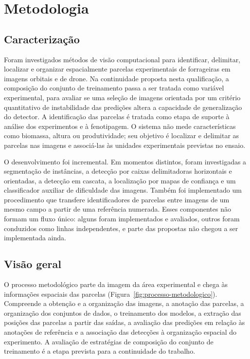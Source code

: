 \chapter{Metodologia}
\label{cap:metodologia}

\section{Caracteriza\c{c}\~ao}
\label{sec:caracterizacao}

Foram investigados m\'etodos de vis\~ao computacional para identificar, delimitar, localizar e organizar espacialmente parcelas experimentais de forrageiras em imagens orbitais e de drone. Na continuidade proposta nesta qualifica\c{c}\~ao, a composi\c{c}\~ao do conjunto de treinamento passa a ser tratada como vari\'avel experimental, para avaliar se uma sele\c{c}\~ao de imagens orientada por um crit\'erio quantitativo de instabilidade das predi\c{c}\~oes altera a capacidade de generaliza\c{c}\~ao do detector. A identifica\c{c}\~ao das parcelas \'e tratada como etapa de suporte \`a an\'alise dos experimentos e \`a fenotipagem. O sistema n\~ao mede caracter\'isticas como biomassa, altura ou produtividade; seu objetivo \'e localizar e delimitar as parcelas nas imagens e associ\'a-las \`as unidades experimentais previstas no ensaio.

O desenvolvimento foi incremental. Em momentos distintos, foram investigadas a segmenta\c{c}\~ao de inst\^ancias, a detec\c{c}\~ao por caixas delimitadoras horizontais e orientadas, a detec\c{c}\~ao em cascata, a localiza\c{c}\~ao por mapas de confian\c{c}a e um classificador auxiliar de dificuldade das imagens. Tamb\'em foi implementado um procedimento que transfere identificadores de parcelas entre imagens de um mesmo campo a partir de uma refer\^encia numerada. Esses componentes n\~ao formam um fluxo \'unico: alguns foram implementados e avaliados, outros foram conduzidos como linhas independentes, e parte das propostas n\~ao chegou a ser implementada ainda.

\section{Vis\~ao geral}
\label{sec:visao-geral-metodologia}

O processo metodol\'ogico parte da imagem da \'area experimental e chega \`as informa\c{c}\~oes espaciais das parcelas (Figura~\ref{fig:processo-metodologico}). Compreende a obten\c{c}\~ao e a organiza\c{c}\~ao das imagens, a anota\c{c}\~ao das parcelas, a organiza\c{c}\~ao dos conjuntos de dados, o treinamento dos modelos, a extra\c{c}\~ao das posi\c{c}\~oes das parcelas a partir das sa\'idas, a avalia\c{c}\~ao das predi\c{c}\~oes em rela\c{c}\~ao \`as anota\c{c}\~oes de refer\^encia e a associa\c{c}\~ao das detec\c{c}\~oes \`a organiza\c{c}\~ao espacial do experimento. A avalia\c{c}\~ao de estrat\'egias de composi\c{c}\~ao do conjunto de treinamento \'e a etapa prevista para a continuidade do trabalho.

